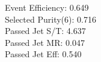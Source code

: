 Event Efficiency:   0.649\\ 
Selected Purity(6): 0.716\\ 
Passed Jet S/T:     4.637\\ 
Passed Jet MR:      0.047\\ 
Passed Jet Eff:     0.540